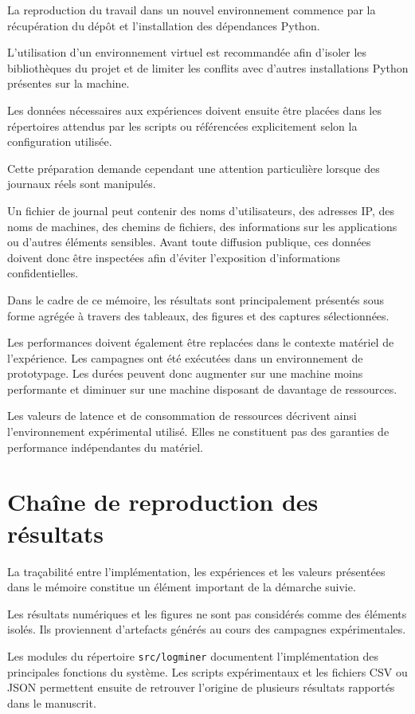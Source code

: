 La reproduction du travail dans un nouvel environnement commence par la récupération du dépôt et l'installation des dépendances Python.

L'utilisation d'un environnement virtuel est recommandée afin d'isoler les bibliothèques du projet et de limiter les conflits avec d'autres installations Python présentes sur la machine.

Les données nécessaires aux expériences doivent ensuite être placées dans les répertoires attendus par les scripts ou référencées explicitement selon la configuration utilisée.

Cette préparation demande cependant une attention particulière lorsque des journaux réels sont manipulés.

Un fichier de journal peut contenir des noms d'utilisateurs, des adresses IP, des noms de machines, des chemins de fichiers, des informations sur les applications ou d'autres éléments sensibles. Avant toute diffusion publique, ces données doivent donc être inspectées afin d'éviter l'exposition d'informations confidentielles.

Dans le cadre de ce mémoire, les résultats sont principalement présentés sous forme agrégée à travers des tableaux, des figures et des captures sélectionnées.

Les performances doivent également être replacées dans le contexte matériel de l'expérience. Les campagnes ont été exécutées dans un environnement de prototypage. Les durées peuvent donc augmenter sur une machine moins performante et diminuer sur une machine disposant de davantage de ressources.

Les valeurs de latence et de consommation de ressources décrivent ainsi l'environnement expérimental utilisé. Elles ne constituent pas des garanties de performance indépendantes du matériel.

\section{Chaîne de reproduction des résultats}

La traçabilité entre l'implémentation, les expériences et les valeurs présentées dans le mémoire constitue un élément important de la démarche suivie.

Les résultats numériques et les figures ne sont pas considérés comme des éléments isolés. Ils proviennent d'artefacts générés au cours des campagnes expérimentales.

Les modules du répertoire \texttt{src/logminer} documentent l'implémentation des principales fonctions du système. Les scripts expérimentaux et les fichiers CSV ou JSON permettent ensuite de retrouver l'origine de plusieurs résultats rapportés dans le manuscrit.

